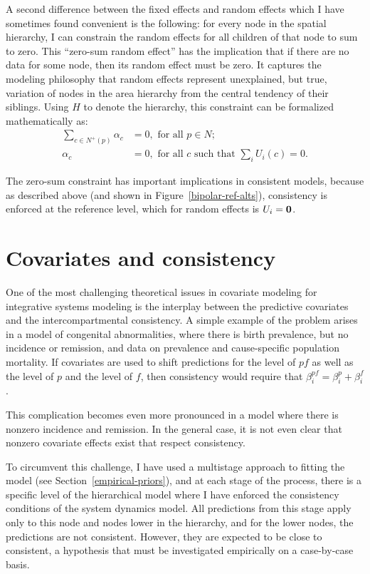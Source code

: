 A second difference between the fixed effects and random effects which
I have sometimes found convenient is
the following: for every node in the spatial hierarchy, I can
constrain the random
effects for all children of that node to sum to zero.  This ``zero-sum
random effect'' has the implication that if there
are no data for some node, then its random effect must be zero.  It
captures the modeling philosophy that random effects represent
unexplained, but true, variation of nodes in the area hierarchy from
the central tendency of their siblings.  Using $H$ to denote the
hierarchy, this constraint can be formalized mathematically as:
\begin{align*}
\sum_{c\in N^+(p)} \alpha_c &= 0, \text{ for all } p \in N;\\
\alpha_c &=0, \text{ for all $c$ such that } \sum_{i} U_i(c) = 0.
\end{align*}

The zero-sum constraint has important implications in consistent
models, because as described above (and shown in
Figure~\ref{bipolar-ref-alts}), consistency is enforced at the
reference level, which for random effects is $U_i = \mathbf{0}$.


\section{Covariates and consistency}
One of the most challenging theoretical issues in covariate modeling
for integrative systems modeling is the interplay between the
predictive covariates and the intercompartmental consistency.  A
simple example of the problem arises in a model of congenital
abnormalities, where there is birth prevalence, but no incidence or
remission, and data on prevalence and cause-specific population
mortality. If covariates are used to shift predictions for the level
of $pf$ as well as the level of $p$ and the level of $f$, then
consistency would require that $\beta^{pf}_i = \beta^p_i + \beta^f_i$.

This complication becomes even more pronounced in a model where there
is nonzero incidence and remission.  In the general case, it is not
even clear that nonzero covariate effects exist that respect
consistency.

To circumvent this challenge, I have used a multistage approach to
fitting the model (see Section~\ref{empirical-priors}), and at each
stage of the process, there is a specific level of the hierarchical
model where I have enforced the consistency conditions of the system
dynamics model.  All predictions from this stage apply only to this
node and nodes lower in the hierarchy, and for the lower nodes, the
predictions are not consistent.  However, they are expected to
be close to consistent, a hypothesis that must be investigated
empirically on a case-by-case basis.

